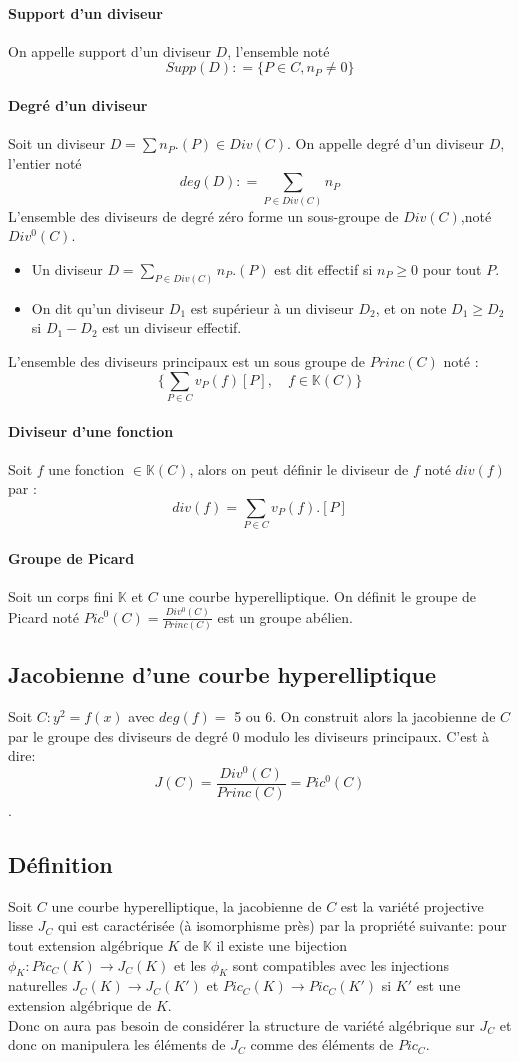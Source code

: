 \documentclass[12pt,a4paper]{article}
\begin{document}
	\paragraph{Support d'un diviseur}
	On appelle support d'un diviseur $D$, l'ensemble not\'e \[Supp(D): =\{P \in C, n_P \neq 0\}
	\] 
	\paragraph{Degré d'un diviseur}
	Soit un diviseur $D = \sum n_P.(P) \in Div(C)$. On appelle degr\'e d'un diviseur $D$, l'entier not\'e \[deg(D): =\sum_{P \in Div(C)} n_P
	\] 
	L'ensemble des diviseurs de degr\'e z\'ero forme un sous-groupe de $Div(C)$,not\'e $Div^0(C)$.
	\begin{itemize}
		\item Un diviseur $D = \sum_{P \in Div(C)}n_P.(P)$ est dit effectif si $n_P \geq 0$ pour tout $P$. 
		\item On dit qu'un diviseur $D_1$ est supérieur \`a un diviseur $D_2$, et on note $D_1 \geq D_2$ si $ D_1 - D_2$ est un diviseur effectif.  
	\end{itemize}
	L'ensemble des diviseurs principaux est un sous groupe de $Princ(C)$ not\'e :
	\[
	\{ \sum_{P \in C} v_P(f)[P], \quad f \in \mathbb{K}(C)\}
	\]
	\paragraph{Diviseur d'une fonction}
	Soit $f$ une fonction $\in \mathbb{K}(C)$, alors on peut définir le diviseur de $f$ not\'e $div(f)$ par :
	\[
	div(f) = \sum_{P \in C} v_P(f).[P]
	\]
	\paragraph{Groupe de Picard}
	Soit un corps fini $\mathbb{K}$ et $C$ une courbe hyperelliptique.
	On définit le groupe de Picard not\'e $Pic^0(C) = \frac{Div^0(C)}{Princ(C)} $ est un groupe ab\'elien.
	\subsection{Jacobienne d'une courbe hyperelliptique}
	Soit $C: y^2 = f(x)$ avec $deg(f) =$ 5 ou 6.
	On construit alors la jacobienne de $C$ par le groupe des diviseurs de degr\'e $0$ modulo les diviseurs principaux. C'est \`a dire: \[J(C) = \frac{Div^0(C)}{Princ(C)} = Pic^0(C) \].
	\subsection{Définition}
	Soit $C$ une courbe hyperelliptique, la jacobienne de $C$ est la variété projective lisse $J_C$ qui est caractérisée (\`a isomorphisme pr\`es) par la propriété suivante: pour tout extension algébrique $K$ de $\mathbb{K}$ il existe une bijection $\phi_K : Pic_C(K) \rightarrow J_C(K)$ et les $\phi_K$ sont compatibles avec les injections naturelles $J_C(K) \rightarrow J_C(K')$ et $Pic_C(K)\rightarrow Pic_C(K')$ si $K'$ est une extension algébrique de $K$.\\  
	Donc on aura pas besoin de considérer la structure de variété algébrique sur $J_C$ et donc on manipulera les éléments de $J_C$ comme des éléments de $Pic_C$.   
\end{document}
